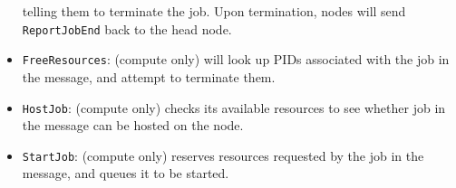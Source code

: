 \documentclass[sigconf]{acmart}
\begin{document}
\begin{itemize}
        telling them to terminate the job. Upon termination, nodes will send \verb|ReportJobEnd| back to the head node.
    \item \verb|FreeResources|: (compute only) will look up PIDs associated with the job in the message, and attempt to
        terminate them.
    \item \verb|HostJob|: (compute only) checks its available resources to see whether job in the message can be hosted on the
        node.
    \item \verb|StartJob|: (compute only) reserves resources requested by the job in the message, and queues it to be started.
\end{itemize}
\end{document}

